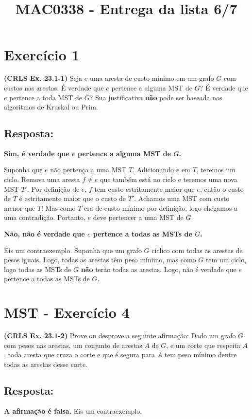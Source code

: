 \documentclass{article}
\title{MAC0338 - Entrega da lista 6/7}
\author{}
\date{}
\begin{document}
\maketitle

\section*{Exercício 1}
\textbf{(CRLS Ex. 23.1-1)} Seja $e$ uma aresta de custo mínimo em um grafo $G$ com custos nas arestas. É verdade que $e$ pertence a alguma MST de $G$? É verdade que $e$ pertence a toda MST de $G$? Sua justificativa \textbf{não} pode ser baseada nos algoritmos de Kruskal ou Prim.

\bigskip

\subsection*{Resposta:}
\textbf{Sim, é verdade que $e$ pertence a alguma MST de $G$.}

Suponha que $e$ não pertença a uma MST $T$. Adicionando $e$ em $T$, teremos um ciclo. Remova uma aresta $f \neq e$ que também está no ciclo e teremos uma nova MST $T'$. Por definição de $e$, $f$ tem custo estritamente maior que $e$, então o custo de $T$ é estritamente maior que o custo de $T'$. Achamos uma MST com custo menor que $T$! Mas como $T$ era de custo mínimo por definição, logo chegamos a uma contradição. Portanto, $e$ deve pertencer a uma MST de $G$.

\bigskip

\textbf{Não, não é verdade que $e$ pertence a todas as MSTs de $G$.}

Eis um contraexemplo. Suponha que um grafo $G$ cíclico com todas as arestas de pesos iguais. Logo, todas as arestas têm peso mínimo, mas como $G$ tem um ciclo, logo todas as MSTs de $G$ \textbf{não} terão todas as arestas. Logo, não é verdade que $e$ pertence a todas as MSTs de $G$.

\newpage

\section*{MST - Exercício 4}
\textbf{(CRLS Ex. 23.1-2)} Prove ou desprove a seguinte afirmação: Dado um grafo $G$ com pesos nas arestas, um conjunto de arestas $A$ de $G$, e um corte que respeita $A$, toda aresta que cruza o corte e que é segura para $A$ tem peso mínimo dentre todas as arestas desse corte.

\subsection*{Resposta:}
\textbf{A afirmação é falsa.} Eis um contraexemplo.

\end{document}
